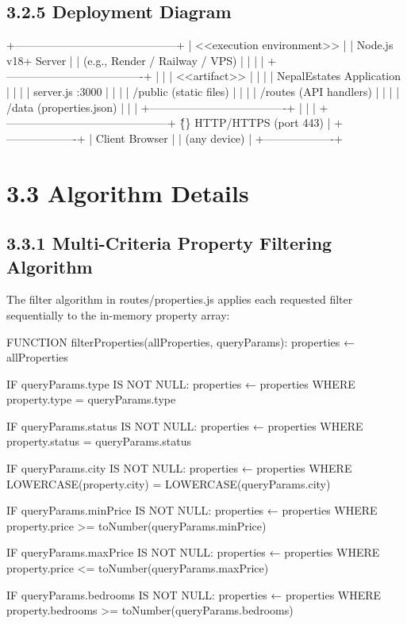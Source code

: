 \documentclass[12pt,a4paper]{report}
\begin{document}
\subsection{3.2.5 Deployment Diagram}
+--------------------------------------------+
|         <<execution environment>>          |
|         Node.js v18+ Server                |
|         (e.g., Render / Railway / VPS)     |
|                                            |
|   +-------------------------------------+  |
|   |      <<artifact>>                   |  |
|   |      NepalEstates Application       |  |
|   |      server.js  :3000               |  |
|   |      /public  (static files)        |  |
|   |      /routes  (API handlers)        |  |
|   |      /data    (properties.json)     |  |
|   +-------------------------------------+  |
|                                            |
+--------------------------------------------+
         \^\{\} HTTP/HTTPS (port 443)
         |
+-------------------+
|  Client Browser   |
|  (any device)     |
+-------------------+

\section{3.3 Algorithm Details}
\subsection{3.3.1 Multi-Criteria Property Filtering Algorithm}
The filter algorithm in routes/properties.js applies each requested filter sequentially to the in-memory property array:

FUNCTION filterProperties(allProperties, queryParams):
  properties ← allProperties

  IF queryParams.type IS NOT NULL:
    properties ← properties WHERE property.type = queryParams.type

  IF queryParams.status IS NOT NULL:
    properties ← properties WHERE property.status = queryParams.status

  IF queryParams.city IS NOT NULL:
    properties ← properties WHERE LOWERCASE(property.city) = LOWERCASE(queryParams.city)

  IF queryParams.minPrice IS NOT NULL:
    properties ← properties WHERE property.price >= toNumber(queryParams.minPrice)

  IF queryParams.maxPrice IS NOT NULL:
    properties ← properties WHERE property.price <= toNumber(queryParams.maxPrice)

  IF queryParams.bedrooms IS NOT NULL:
    properties ← properties WHERE property.bedrooms >= toNumber(queryParams.bedrooms)
\end{document}
